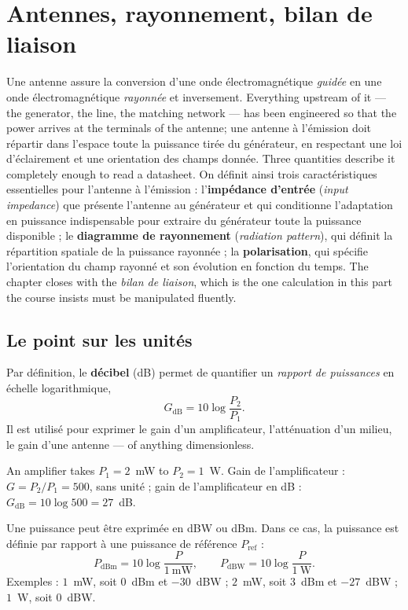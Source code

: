 \section{Antennes, rayonnement, bilan de liaison}
Une antenne assure la conversion d'une onde électromagnétique \emph{guidée} en
une onde électromagnétique \emph{rayonnée} et inversement. Everything upstream
of it --- the generator, the line, the matching network --- has been engineered
so that the power arrives at the terminals of the antenne; une antenne à
l'émission doit répartir dans l'espace toute la puissance tirée du générateur,
en respectant une loi d'éclairement et une orientation des champs donnée. Three
quantities describe it completely enough to read a datasheet. On définit ainsi
trois caractéristiques essentielles pour l'antenne à l'émission :
l'\textbf{impédance d'entrée} (\textit{input impedance}) que présente l'antenne
au générateur et qui conditionne l'adaptation en puissance indispensable pour
extraire du générateur toute la puissance disponible ; le \textbf{diagramme de
rayonnement} (\textit{radiation pattern}), qui définit la répartition spatiale
de la puissance rayonnée ; la \textbf{polarisation}, qui spécifie l'orientation
du champ rayonné et son évolution en fonction du temps. The chapter closes with
the \emph{bilan de liaison}, which is the one calculation in this part the
course insists must be manipulated fluently.

\subsection{Le point sur les unités}

\begin{definition}[Décibel]
  Par définition, le \textbf{décibel} (dB) permet de quantifier un
  \emph{rapport de puissances} en échelle logarithmique,
  \[ G_{\mathrm{dB}} = 10 \log \frac{P_2}{P_1}. \]
  Il est utilisé pour exprimer le gain d'un amplificateur, l'atténuation d'un
  milieu, le gain d'une antenne --- of anything dimensionless.
\end{definition}

\begin{example}[Amplifier]
  An amplifier takes $P_1 = 2$~mW to $P_2 = 1$~W. Gain de l'amplificateur :
  $G = P_2/P_1 = 500$, sans unité ; gain de l'amplificateur en dB :
  $G_{\mathrm{dB}} = 10 \log 500 = 27$~dB.
\end{example}

\begin{definition}
  Une puissance peut être exprimée en dBW ou dBm. Dans ce cas, la puissance est
  définie par rapport à une puissance de référence $P_{\mathrm{ref}}$ :
  \[ P_{\mathrm{dBm}} = 10 \log \frac{P}{1\ \mathrm{mW}}, \qquad
     P_{\mathrm{dBW}} = 10 \log \frac{P}{1\ \mathrm{W}}. \]
  Exemples : $1$~mW, soit $0$~dBm et $-30$~dBW ; $2$~mW, soit $3$~dBm et
  $-27$~dBW ; $1$~W, soit $0$~dBW.
\end{definition}

